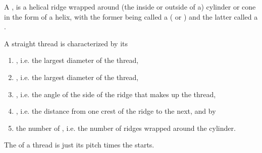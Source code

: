 \begin{module}[id=thread]
\begin{definition}
  A , is a helical ridge wrapped around (the inside or outside of a)
  cylinder or cone in the form of a helix, with the former being called a
   ( or ) and the
  latter called a .

  A straight thread is characterized by its
  \begin{enumerate}
  \item {}, i.e. the largest diameter of the thread,
  \item {}, i.e. the largest diameter of the thread,
  \item {}, i.e. the angle of the side of the ridge that makes up the thread,
  \item {}, i.e. the distance from one crest of the ridge to the next, and by
  \item the number of , i.e. the number of ridges wrapped around the
    cylinder.
  \end{enumerate}
  The  of a thread is just its pitch times the starts.
\end{definition}
\end{module}


